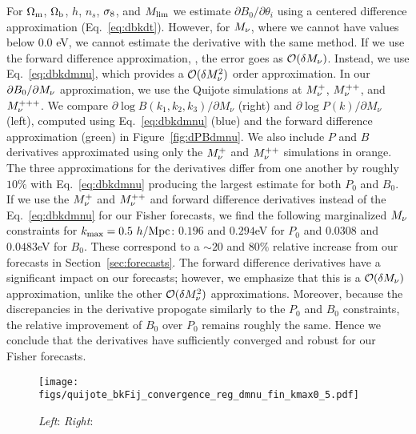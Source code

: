 For $\Omega_{\rm m}$, $\Omega_{\rm b}$, $h$, $n_s$, $\sigma_8$, and $M_{\rm lim}$ we estimate 
$\partial B_0/\partial \theta_i$ using a centered difference approximation 
(Eq.~\ref{eq:dbkdt}). However, for $M_\nu$, where we cannot have values below 
0.0 eV, we cannot estimate the derivative with the same method. If we use the 
forward difference approximation, 
\beq 
{} \approx {}, 
\eeq
the error goes as $\mathcal{O}(\delta M_\nu)$. Instead, we use Eq.~\ref{eq:dbkdmnu},
which provides a $\mathcal{O}(\delta M_\nu^2)$ order approximation. In our 
$\partial B_0/\partial M_\nu$ approximation, we use the Quijote simulations at 
$M_\nu^{+}$, $M_\nu^{++}$, and $M_\nu^{+++}$. We compare 
$\partial \log B(k_1, k_2, k_3)/\partial M_\nu$ (right) and 
$\partial \log P(k)/\partial M_\nu$ (left), computed using Eq.~\ref{eq:dbkdmnu} (blue) 
and the forward difference approximation (green) in Figure~\ref{fig:dPBdmnu}.
We also include $P$ and $B$ derivatives approximated using only the $M_\nu^{+}$ and 
$M_\nu^{++}$ simulations in orange.  The three approximations for the 
derivatives differ from one another by roughly $10\%$ with Eq.~\ref{eq:dbkdmnu} producing 
the largest estimate for both $P_0$ and $B_0$. If we use the $M_\nu^{+}$ and $M_\nu^{++}$ 
and forward difference derivatives instead of the Eq.~\ref{eq:dbkdmnu} for our Fisher 
forecasts, we find the following marginalized $M_\nu$ constraints for $k_{\rm max} = 0.5~h/{\rm Mpc}$: 
$0.196$ and $0.294$eV for $P_0$ and  $0.0308$ and $0.0483$eV for $B_0$. These correspond 
to a $\sim20$ and $80\%$ relative increase from our forecasts in Section~\ref{sec:forecasts}. 
The forward difference derivatives have a significant impact on our forecasts; however, 
we emphasize that this is a 
$\mathcal{O}(\delta M_\nu)$ approximation, unlike the other $\mathcal{O}(\delta M_\nu^2)$ 
approximations. Moreover, because the discrepancies in the derivative propogate similarly
to the $P_0$ and $B_0$ constraints, the relative improvement of $B_0$ over $P_0$ remains
roughly the same. Hence we conclude that the derivatives have sufficiently converged and 
robust for our Fisher forecasts.

\begin{figure}
\begin{center}
    \texttt{[image: figs/quijote\_bkFij\_convergence\_reg\_dmnu\_fin\_kmax0\_5.pdf]}
    \caption{{\em Left}: {\em Right}:}
\label{fig:fij_converge}
\end{center}
\end{figure}

